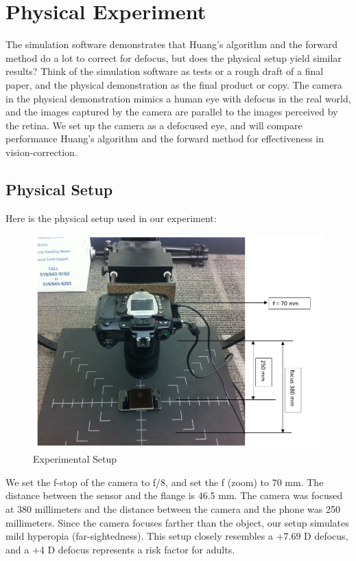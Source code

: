 \chapter{Physical Experiment}

The simulation software demonstrates that Huang's algorithm and the forward method do a lot to correct for defocus, but does the physical setup yield similar results? Think of the simulation software as tests or a rough draft of a final paper, and the physical demonstration as the final product or copy. The camera in the physical demonstration mimics a human eye with defocus in the real world, and the images captured by the camera are parallel to the images perceived by the retina. We set up the camera as a defocused eye, and will compare performance Huang's algorithm and the forward method for effectiveness in vision-correction.


\section{Physical Setup}

Here is the physical setup used in our experiment: 

\begin{figure}[ht]
  \centering
  \includegraphics[width=5in]{chapters/chapter5/images/Setup.png}
  \caption{Experimental Setup}
  \label{fig:physical_setup}
\end{figure}
 
We set the f-stop of the camera to f/8, and set the f (zoom) to 70 mm. The distance between the sensor and the flange is 46.5 mm. The camera was focused at 380 millimeters and the distance between the camera and the phone was 250 millimeters. Since the camera focuses farther than the object, our setup simulates mild hyperopia (far-sightedness). This setup closely resembles a +7.69 D defocus, and a +4 D defocus represents a risk factor for adults. 

